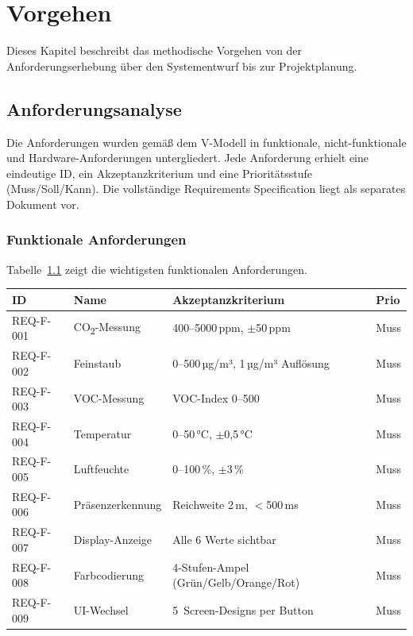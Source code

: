 \chapter{Vorgehen}
\label{cha:vorgehen}

Dieses Kapitel beschreibt das methodische Vorgehen von der Anforderungserhebung über den Systementwurf bis zur Projektplanung.

\section{Anforderungsanalyse}
\label{sec:requirements}

Die Anforderungen wurden gemäß dem V-Modell in funktionale, nicht-funktionale und Hardware-Anforderungen untergliedert. Jede Anforderung erhielt eine eindeutige ID, ein Akzeptanzkriterium und eine Prioritätsstufe (Muss/Soll/Kann). Die vollständige Requirements Specification liegt als separates Dokument vor.

\subsection{Funktionale Anforderungen}
\label{sec:func_req}

Tabelle~\ref{tab:func_req} zeigt die wichtigsten funktionalen Anforderungen.

\begin{table}[htb]
\centering
\renewcommand{\arraystretch}{1.3}
\label{tab:func_req}
\begin{tabular}{p{2cm} p{2.5cm} p{5cm} p{1.2cm}}
\toprule
\rowcolor{tableheader}
\textbf{ID} & \textbf{Name} & \textbf{Akzeptanzkriterium} & \textbf{Prio} \\
\midrule
REQ-F-001 & CO\textsubscript{2}-Messung & 400--5000\,ppm, $\pm$50\,ppm & Muss \\
REQ-F-002 & Feinstaub & 0--500\,µg/m³, 1\,µg/m³ Auflösung & Muss \\
REQ-F-003 & VOC-Messung & VOC-Index 0--500 & Muss \\
REQ-F-004 & Temperatur & 0--50\,°C, $\pm$0,5\,°C & Muss \\
REQ-F-005 & Luftfeuchte & 0--100\,\%, $\pm$3\,\% & Muss \\
REQ-F-006 & Präsenzerkennung & Reichweite 2\,m, $<$500\,ms & Muss \\
REQ-F-007 & Display-Anzeige & Alle 6 Werte sichtbar & Muss \\
REQ-F-008 & Farbcodierung & 4-Stufen-Ampel (Grün/Gelb/Orange/Rot) & Muss \\
REQ-F-009 & UI-Wechsel & 5~Screen-Designs per Button & Muss \\
\bottomrule
\end{tabular}
\end{table}

